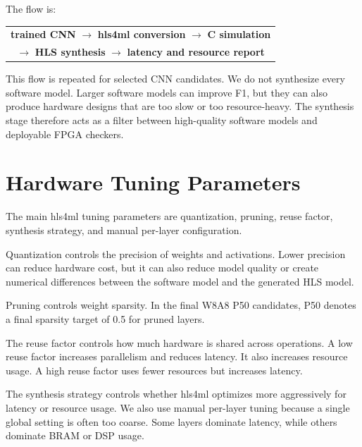 The flow is:

\begin{center}
\small
\begin{tabular}{c}
\textbf{trained CNN} $\rightarrow$ \textbf{hls4ml conversion} $\rightarrow$ \textbf{C simulation} \\[3pt]
$\rightarrow$ \textbf{HLS synthesis} $\rightarrow$ \textbf{latency and resource report}
\end{tabular}
\end{center}

This flow is repeated for selected CNN candidates. We do not synthesize every software model. Larger software models can improve F1, but they can also produce hardware designs that are too slow or too resource-heavy. The synthesis stage therefore acts as a filter between high-quality software models and deployable FPGA checkers.

\section{Hardware Tuning Parameters}
\label{sec:hls4ml-knobs}

The main hls4ml tuning parameters are quantization, pruning, reuse factor, synthesis strategy, and manual per-layer configuration.

Quantization controls the precision of weights and activations. Lower precision can reduce hardware cost, but it can also reduce model quality or create numerical differences between the software model and the generated HLS model.

Pruning controls weight sparsity. In the final W8A8 P50 candidates, P50 denotes a final sparsity target of 0.5 for pruned layers.

The reuse factor controls how much hardware is shared across operations. A low reuse factor increases parallelism and reduces latency. It also increases resource usage. A high reuse factor uses fewer resources but increases latency.

The synthesis strategy controls whether hls4ml optimizes more aggressively for latency or resource usage. We also use manual per-layer tuning because a single global setting is often too coarse. Some layers dominate latency, while others dominate BRAM or DSP usage.

